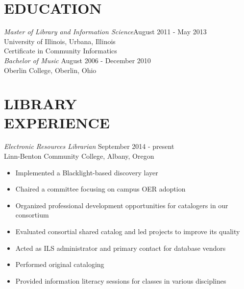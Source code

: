 \documentclass[line,margin]{res}
\begin{document}
\address{6500 Pacific Blvd SW -- Albany, Oregon, 97321}
\address{\hspace{.3in} sandbej@linnbenton.edu -- (541) 917 4655}
\renewcommand{\labelitemi}{$\ddagger$}

\begin{resume}
 
     \section{EDUCATION}
  {\sl Master of Library and Information Science}\hfill August 2011 - May 2013\\
    University of Illinois, Urbana, Illinois \\
    Certificate in Community Informatics \\
    

    {\sl Bachelor of Music} \hfill August 2006 - December 2010\\
    Oberlin College, Oberlin, Ohio \\

\vspace{12pt}

 
\section{LIBRARY \\ EXPERIENCE}
  {\sl Electronic Resources Librarian} \hfill September 2014 - present \\
  Linn-Benton Community College, Albany, Oregon
    \begin{itemize}  \itemsep -1pt %
      \item Implemented a Blacklight-based discovery layer
      \item Chaired a committee focusing on campus OER adoption
      \item Organized professional development opportunities for catalogers in our consortium
      \item Evaluated consortial shared catalog and led projects to improve its quality
      \item Acted as ILS administrator and primary contact for database vendors
      \item Performed original cataloging
      \item Provided information literacy sessions for classes in various disciplines
    \end{itemize}
\vspace{8pt}


\end{resume}
\end{document}
